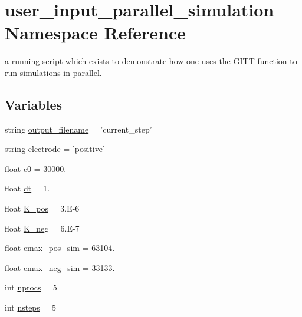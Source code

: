 \hypertarget{namespaceuser__input__parallel__simulation}{\section{user\-\_\-input\-\_\-parallel\-\_\-simulation Namespace Reference}
\label{namespaceuser__input__parallel__simulation}
}


a running script which exists to demonstrate how one uses the G\-I\-T\-T function to run simulations in parallel.  


\subsection*{Variables}
\begin{DoxyCompactItemize}
\item 
string \hyperlink{namespaceuser__input__parallel__simulation_ac0647ad8713153cc6b448750dbeb1b15}{output\-\_\-filename} = 'current\-\_\-step'
\item 
string \hyperlink{namespaceuser__input__parallel__simulation_a6d9f4e281307eca8be6bad984ed9786d}{electrode} = 'positive'
\item 
float \hyperlink{namespaceuser__input__parallel__simulation_aa3407022b348cd058d9808eed482ab4a}{c0} = 30000.
\item 
float \hyperlink{namespaceuser__input__parallel__simulation_a778e38aa889751afffa2dea6b803e67a}{dt} = 1.
\item 
float \hyperlink{namespaceuser__input__parallel__simulation_ab1a8ebec490ba1301f818bd1c5f1f3fa}{K\-\_\-pos} = 3.\-E-\/6
\item 
float \hyperlink{namespaceuser__input__parallel__simulation_a64d0c5854299798787675bc91586023c}{K\-\_\-neg} = 6.\-E-\/7
\item 
float \hyperlink{namespaceuser__input__parallel__simulation_aa5b015cc7d0bda453c6163023448db72}{cmax\-\_\-pos\-\_\-sim} = 63104.
\item 
float \hyperlink{namespaceuser__input__parallel__simulation_ab7633a5e9c70aabfe6992e4fe521a1f9}{cmax\-\_\-neg\-\_\-sim} = 33133.
\item 
int \hyperlink{namespaceuser__input__parallel__simulation_ad7c4c17cf720ee538e27c02ab356ed6b}{nprocs} = 5
\item 
int \hyperlink{namespaceuser__input__parallel__simulation_aa2414080b021dbb9b56eeaeedec0ffa2}{nsteps} = 5
\item 

\end{DoxyCompactItemize}
